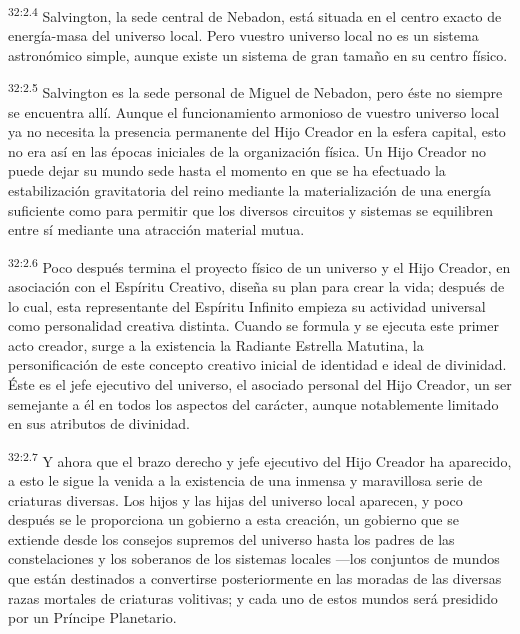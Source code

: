 \par
\textsuperscript{32:2.4} Salvington, la sede central de Nebadon, está situada en el centro exacto de energía-masa del universo local. Pero vuestro universo local no es un sistema astronómico simple, aunque existe un sistema de gran tamaño en su centro físico.

\par
\textsuperscript{32:2.5} Salvington es la sede personal de Miguel de Nebadon, pero éste no siempre se encuentra allí. Aunque el funcionamiento armonioso de vuestro universo local ya no necesita la presencia permanente del Hijo Creador en la esfera capital, esto no era así en las épocas iniciales de la organización física. Un Hijo Creador no puede dejar su mundo sede hasta el momento en que se ha efectuado la estabilización gravitatoria del reino mediante la materialización de una energía suficiente como para permitir que los diversos circuitos y sistemas se equilibren entre sí mediante una atracción material mutua.

\par
\textsuperscript{32:2.6} Poco después termina el proyecto físico de un universo y el Hijo Creador, en asociación con el Espíritu Creativo, diseña su plan para crear la vida; después de lo cual, esta representante del Espíritu Infinito empieza su actividad universal como personalidad creativa distinta. Cuando se formula y se ejecuta este primer acto creador, surge a la existencia la Radiante Estrella Matutina, la personificación de este concepto creativo inicial de identidad e ideal de divinidad. Éste es el jefe ejecutivo del universo, el asociado personal del Hijo Creador, un ser semejante a él en todos los aspectos del carácter, aunque notablemente limitado en sus atributos de divinidad.

\par
\textsuperscript{32:2.7} Y ahora que el brazo derecho y jefe ejecutivo del Hijo Creador ha aparecido, a esto le sigue la venida a la existencia de una inmensa y maravillosa serie de criaturas diversas. Los hijos y las hijas del universo local aparecen, y poco después se le proporciona un gobierno a esta creación, un gobierno que se extiende desde los consejos supremos del universo hasta los padres de las constelaciones y los soberanos de los sistemas locales ---los conjuntos de mundos que están destinados a convertirse posteriormente en las moradas de las diversas razas mortales de criaturas volitivas; y cada uno de estos mundos será presidido por un Príncipe Planetario.

